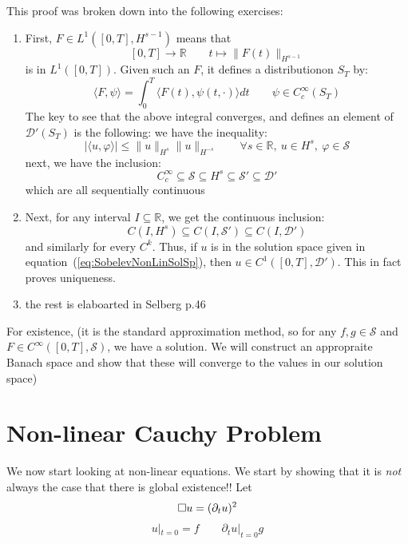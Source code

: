 \documentclass{book}
\newenvironment{Proof}[1][]
  {\begin{ProofTcb}[#1]}
  {\end{ProofTcb}}
\newcommand{\R}{{\mathbb{R}}}
\newcommand{\CD}{{\mathcal{D}}}
\newcommand{\CS}{{\mathcal{S}}}
\newcommand{\sse}{\subseteq}
\renewcommand{\phi}{\varphi}
\newcommand{\rw}{\rightarrow}
\begin{document}
\begin{Proof}
	This proof was broken down into the following exercises:
	\begin{enumerate}
		\item First, $F \in L^1([0,T], H^{s-1})$ means that
			\[
				[0,T] \rw \R \qquad t \mapsto \|F(t)\|_{H^{s-1}}
			\]
			is in $L^1([0,T])$. Given such an $F$, it defines a distributionon $S_T$ by:
			\[
				\langle F, \psi\rangle = \int_0^T \langle F(t), \psi(t, \cdot)\rangle dt \qquad \psi \in C_c^\infty(S_T)
			\]
			The key to see that the above integral converges, and defines an element of $\CD'(S_T)$ is the following: we
			have the inequality:
			\[
				|\langle u, \phi\rangle| \le \|u\|_{H^s}\|u\|_{H^{-s}} \qquad \forall s \in \R,\ u \in H^s,\ \phi \in \CS
			\]
			next, we have the inclusion:
			\[
				C_c^\infty \sse \CS \sse H^s \sse \CS' \sse \CD'
			\]
			which are all sequentially continuous
		\item Next, for any interval $I \sse \R$, we get the continuous inclusion:
			\[
				C(I, H^s) \sse C(I, \CS') \sse C(I, \CD')
			\]
			and similarly for every $C^k$. Thus, if $u$ is in the solution space given in
			equation~(\ref{eq:SobelevNonLinSolSp}), then $u \in C^1([0,T], \CD')$. This in fact proves uniqueness.
		\item the rest is elaboarted in Selberg p.46
	\end{enumerate}

	For existence, (it is the standard approximation method, so for any $f,g \in \CS$ and $F\in C^\infty([0,T], \CS)$,
	we have a solution. We will construct an appropraite Banach space and show that these will converge to the values in
	our solution space)
\end{Proof}

\section{Non-linear Cauchy Problem}

We now start looking at non-linear equations. We start by showing that it is \emph{not} always the case that there is
global existence!! Let
\begin{equation}\label{eq:nonLinWaveEq1}
  \square u = (  \partial_t u )^2\\
\end{equation}
\begin{equation}\label{eq:nonLinWaveEq2}
  u|_{t=0} = f\qquad  \partial_t u|_{t=0} g
\end{equation}
\end{document}

